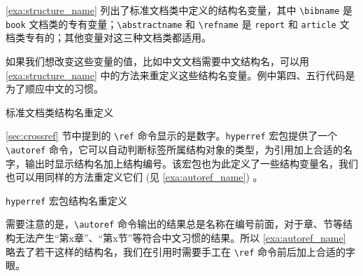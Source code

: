 \autoref{exa:structure_name} 列出了标准文档类中定义的结构名变量，其中 \verb|\bibname| 是 \texttt{book} 文档类的专有变量；\verb|\abstractname| 和 \verb|\refname| 是 \texttt{report} 和 \texttt{article} 文档类专有的；其他变量对这三种文档类都适用。

如果我们想改变这些变量的值，比如中文文档需要中文结构名，可以用 \autoref{exa:structure_name} 中的方法来重定义这些结构名变量。例中第四、五行代码是为了顺应中文的习惯。

\begin{example}[h]
\begin{Code}[]
\renewcommand{\contentsname}{`目录`}
\renewcommand{\listfigurename}{`图目录`}
\renewcommand{\listtablename}{`表目录`}
\renewcommand{\partname}{`第` \thepart `部`}
\renewcommand{\chaptername}{`第` \thechapter `章`}
\renewcommand{\figurename}{`图`}
\renewcommand{\tablename}{`表`}
\renewcommand{\bibname}{`参考文献`}
\renewcommand{\appendixname}{`附录`}
\renewcommand{\indexname}{`索引`}
\renewcommand{\abstractname}{`摘要`}
\renewcommand{\refname}{`参考文献`}
\end{Code}
\caption{标准文档类结构名重定义}
\label{exa:structure_name}
\end{example}

\ref{sec:crossref} 节中提到的 \verb|\ref| 命令显示的是数字。\texttt{hyperref} 宏包提供了一个 \verb|\autoref| 命令，它可以自动判断标签所属结构对象的类型，为引用加上合适的名字，输出时显示结构名加上结构编号。该宏包也为此定义了一些结构变量名，我们也可以用同样的方法重定义它们 (见 \autoref{exa:autoref_name}) 。

\begin{example}[h]
\begin{Code}[]
\renewcommand{\equationautorefname}{`公式`}
\renewcommand{ \footnoteautorefname}{`脚注`}
\renewcommand{\itemautorefname}{`项`}
\renewcommand{\figureautorefname}{`图`}
\renewcommand{\tableautorefname}{`表`}
\renewcommand{\appendixautorefname}{`附录`}
\renewcommand{\theoremautorefname}{`定理`}
\end{Code}
\caption{\texttt{hyperref} 宏包结构名重定义}
\label{exa:autoref_name}
\end{example}

需要注意的是，\verb|\autoref| 命令输出的结果总是名称在编号前面，对于章、节等结构无法产生“第x章”、“第x节”等符合中文习惯的结果。所以 \autoref{exa:autoref_name} 略去了若干这样的结构名，我们在引用时需要手工在 \verb|\ref| 命令前后加上合适的字眼。




